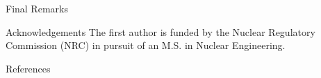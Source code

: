 \documentclass[aspectratio=1610,pdftex,dvipsnames]{beamer}
\begin{document}
\begin{frame}{Final Remarks}
    
\end{frame}

\begin{frame}{Acknowledgements}
    \centering
    The first author is funded by the Nuclear Regulatory Commission (NRC) in pursuit of an M.S. in Nuclear Engineering.
\end{frame}


\begin{frame}{References}
    
    \footnotesize
    
\end{frame}
\end{document}

